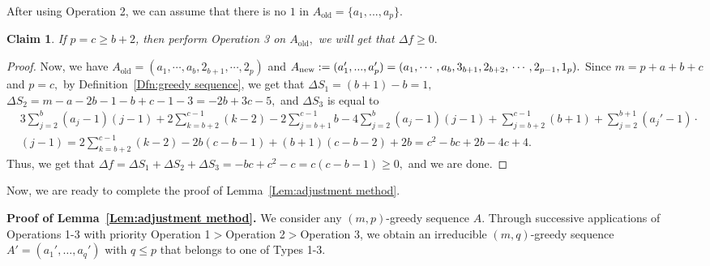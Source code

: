 \documentclass[11pt,a4paper]{article}
\newtheorem{clm}[dfn]{Claim}
\begin{document}
After using Operation 2, we can assume that there is no $1$ in $A_{\text{old}}=\{a_1,...,a_p\}$.

\begin{clm}\label{Clm:adjust 3}
	If $p=c\geq b+2$, 
    then perform Operation 3 on $A_{\text{old}},$ 
    we will get that $\Delta f\ge0.$
\end{clm}
\begin{proof}
Now, we have $A_{\text{old}}=(a_1,\cdots, a_b,2_{b+1},\cdots,2_p)$ and 
$A_{\text{new}}:=(a_1',...,a_{p}')=(a_1,\cdots, a_b,3_{b+1},2_{b+2},\\\cdots,2_{p-1},1_p).$
Since $m=p+a+b+c$ and $p=c,$ by Definition~\ref{Dfn:greedy sequence}, 
we get that
$\Delta S_1 =(b+1)-b=1,$ 
$\Delta S_2=m-a-2b-1-b+c-1-3=-2b+3c-5,$
and $\Delta S_3$ is equal to
\begin{align*}
&3\sum_{j=2}^{b}(a_j-1)(j-1)
+2\sum_{k=b+2}^{c-1}(k-2)
-2 \sum_{j=b+1}^{c-1}b - 4\sum_{j=2}^{b}(a_j-1)(j-1) + \sum_{j=b+2}^{c-1}(b+1) + \sum_{j=2}^{b+1}(a_j'-1)\cdot \\
& (j-1)
=2\sum_{k=b+2}^{c-1}(k-2)-2b(c-b-1)+(b+1)(c-b-2)+2b
=c^2-bc+2b-4c+4.
\end{align*}
Thus, we get that $\Delta f =\Delta S_1+\Delta S_2+\Delta S_3= -bc+c^2-c=c(c-b-1)\geq 0,$ and we are done.
\end{proof}

Now, we are ready to complete the proof of Lemma~\ref{Lem:adjustment method}.

\noindent
\textbf{Proof of Lemma~\ref{Lem:adjustment method}.}
We consider any $(m,p)$-greedy sequence $A$. 
Through successive applications of Operations 1-3 with priority Operation 1$>$Operation 2$>$Operation 3, we obtain an irreducible $(m,q)$-greedy sequence $A' = (a_1',\ldots,a_q')$ with $q \leq p$ that belongs to one of Types 1-3. 
\end{document}
